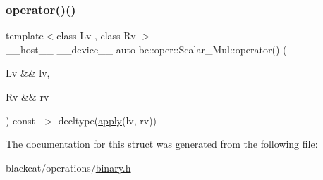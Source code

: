 \mbox{\label{structbc_1_1oper_1_1Scalar__Mul_a327fe310e3961fbebc4309a96d38f3d0}} 
\subsubsection{\texorpdfstring{operator()()}{operator()()}}
{\footnotesize\ttfamily template$<$class Lv , class Rv $>$ \\
\+\_\+\+\_\+host\+\_\+\+\_\+ \+\_\+\+\_\+device\+\_\+\+\_\+ auto bc\+::oper\+::\+Scalar\+\_\+\+Mul\+::operator() (\begin{DoxyParamCaption}\item[{Lv \&\&}]{lv,  }\item[{Rv \&\&}]{rv }\end{DoxyParamCaption}) const -\/$>$ decltype(\hyperlink{structbc_1_1oper_1_1Scalar__Mul_a40d224204c48aaf6ea6392108915879b}{apply}(lv, rv)) \hspace{0.3cm}{\ttfamily [inline]}}



The documentation for this struct was generated from the following file\+:\begin{DoxyCompactItemize}
\item 
blackcat/operations/\hyperlink{binary_8h}{binary.\+h}\end{DoxyCompactItemize}
